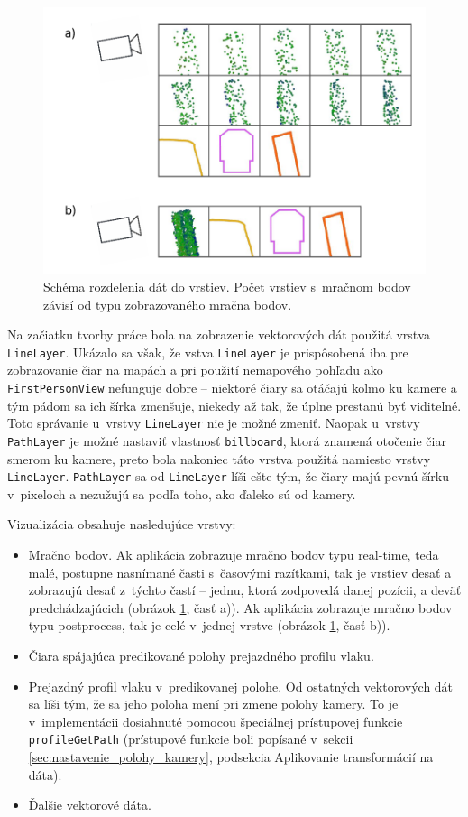 \begin{figure}[h]
    \centering
    \includegraphics[width=0.8\linewidth]{text_prace/obrazky-figures/vrstvy.pdf}
    \caption[Schéma rozdelenia dát do vrstiev.]{Schéma rozdelenia dát do vrstiev. Počet vrstiev s~mračnom bodov závisí od typu zobrazovaného mračna bodov.}
    \label{fig:vrstvy}
\end{figure}

Na začiatku tvorby práce bola na zobrazenie vektorových dát použitá vrstva \texttt{LineLayer}. Ukázalo sa však, že vstva \texttt{LineLayer} je prispôsobená iba pre zobrazovanie čiar na mapách a pri použití nemapového pohľadu ako \texttt{FirstPersonView} nefunguje dobre -- niektoré čiary sa otáčajú kolmo ku kamere a tým pádom sa ich šírka zmenšuje, niekedy až tak, že úplne prestanú byť viditeľné. Toto správanie u~vrstvy \texttt{LineLayer} nie je možné zmeniť. Naopak u~vrstvy \texttt{PathLayer} je možné nastaviť vlastnosť \texttt{billboard}, ktorá znamená otočenie čiar smerom ku kamere, preto bola nakoniec táto vrstva použitá namiesto vrstvy \texttt{LineLayer}. \texttt{PathLayer} sa od \texttt{LineLayer} líši ešte tým, že čiary majú pevnú šírku v~pixeloch a nezužujú sa podľa toho, ako ďaleko sú od kamery.

Vizualizácia obsahuje nasledujúce vrstvy:
\begin{itemize}
    \item Mračno bodov. Ak aplikácia zobrazuje mračno bodov typu real-time, teda malé, postupne nasnímané časti s~časovými razítkami, tak je vrstiev desať a zobrazujú desať z~týchto častí -- jednu, ktorá zodpovedá danej pozícii, a deväť predchádzajúcich (obrázok \ref{fig:vrstvy}, časť a)). Ak aplikácia zobrazuje mračno bodov typu postprocess, tak je celé v~jednej vrstve (obrázok \ref{fig:vrstvy}, časť b)).
    \item Čiara spájajúca predikované polohy prejazdného profilu vlaku.
    \item Prejazdný profil vlaku v~predikovanej polohe. Od ostatných vektorových dát sa líši tým, že sa jeho poloha mení pri zmene polohy kamery. To je v~implementácii dosiahnuté pomocou špeciálnej prístupovej funkcie \texttt{profileGetPath} (prístupové funkcie boli popísané v~sekcii \ref{sec:nastavenie_polohy_kamery}, podsekcia Aplikovanie transformácií na dáta). 
    \item Ďalšie vektorové dáta.
\end{itemize}


